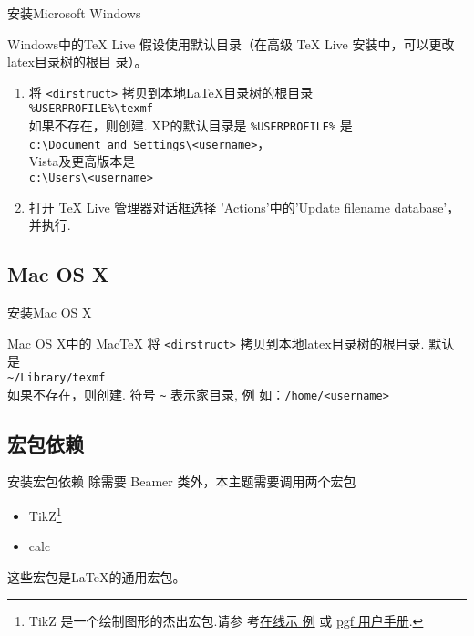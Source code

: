 \begin{frame}{安装}{Microsoft Windows}
  \begin{block}{Windows中的TeX Live}
    假设使用默认目录（在高级 TeX Live 安装中，可以更改latex目录树的根目
    录）。
    \begin{enumerate}
    \item 将 {\tt <dirstruct>} 拷贝到本地{\LaTeX}目录树的根目录\\
      {\tt \%USERPROFILE\%\textbackslash texmf}\\
      如果不存在，则创建. XP的默认目录是 {\tt \%USERPROFILE\%} 是\\
      {\tt c:\textbackslash Document and
        Settings\textbackslash<username>}，\\
      Vista及更高版本是\\
      {\tt c:\textbackslash Users\textbackslash<username>}
    \item 打开 TeX Live 管理器对话框选择 'Actions'中的'Update filename
      database'，并执行.
    \end{enumerate}
  \end{block}
\end{frame}

\subsection{Mac OS X}
\begin{frame}{安装}{Mac OS X}
  \begin{block}{Mac OS X中的 MacTeX}
    将 {\tt <dirstruct>} 拷贝到本地latex目录树的根目录. 默认是\\
    {\tt \textasciitilde /Library/texmf}\\
    如果不存在，则创建. 符号 {\tt \textasciitilde} 表示家目录, 例
    如：{\tt /home/<username>}
  \end{block}
\end{frame}

\subsection{宏包依赖}
\begin{frame}{安装}{宏包依赖}
  除需要 Beamer 类外，本主题需要调用两个宏包
  \begin{itemize}
  \item TikZ\footnote{TikZ 是一个绘制图形的杰出宏包.请参
      考\href{http://www.texample.net/tikz/examples/}{在线示
        例} 或
      \href{http://tug.ctan.org/tex-archive/graphics/pgf/base/doc/generic/pgf/pgfmanual.pdf}{pgf
        用户手册}. }
  \item calc
  \end{itemize}
  这些宏包是{\LaTeX}的通用宏包。
\end{frame}


